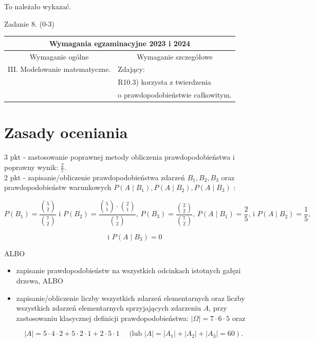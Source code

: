 \documentclass[10pt]{article}
\begin{document}
To należało wykazać.

Zadanie 8. (0-3)

\begin{center}
\begin{tabular}{|l|l|}
\hline
\multicolumn{2}{|c|}{Wymagania egzaminacyjne 2023 i 2024} \\
\hline
\multicolumn{1}{|c|}{Wymaganie ogólne} & \multicolumn{1}{|c|}{Wymaganie szczegółowe} \\
\hline
III. Modelowanie matematyczne. & Zdający: \\
 & R10.3) korzysta z twierdzenia \\
 & o prawdopodobieństwie całkowitym. \\
\hline
\end{tabular}
\end{center}

\section*{Zasady oceniania}
3 pkt - zastosowanie poprawnej metody obliczenia prawdopodobieństwa i poprawny wynik: $\frac{2}{7}$.\\
2 pkt - zapisanie/obliczenie prawdopodobieństwa zdarzeń $B_{1}, B_{2}, B_{3}$ oraz prawdopodobieństw warunkowych $P\left(A \mid B_{1}\right), P\left(A \mid B_{2}\right), P\left(A \mid B_{3}\right)$ :

$$
P\left(B_{1}\right)=\frac{\binom{5}{2}}{\binom{7}{2}} \text { i } P\left(B_{2}\right)=\frac{\binom{5}{1} \cdot\binom{2}{1}}{\binom{7}{2}} \text {, } P\left(B_{3}\right)=\frac{\binom{2}{2}}{\binom{7}{2}} \text {, } P\left(A \mid B_{1}\right)=\frac{2}{5} \text {, i } P\left(A \mid B_{2}\right)=\frac{1}{5} \text {, }
$$

$$
\text { i } P\left(A \mid B_{3}\right)=0
$$

ALBO

\begin{itemize}
  \item zapisanie prawdopodobieństw na wszystkich odcinkach istotnych gałęzi drzewa, ALBO
  \item zapisanie/obliczenie liczby wszystkich zdarzeń elementarnych oraz liczby wszystkich zdarzeń elementarnych sprzyjających zdarzeniu $A$, przy zastosowaniu klasycznej definicji prawdopodobieństwa: $|\Omega|=7 \cdot 6 \cdot 5$ oraz
\end{itemize}

$$
\left.|A|=5 \cdot 4 \cdot 2+5 \cdot 2 \cdot 1+2 \cdot 5 \cdot 1 \quad \text { (lub }|A|=\left|A_{1}\right|+\left|A_{2}\right|+\left|A_{3}\right|=60\right) .
$$
\end{document}
